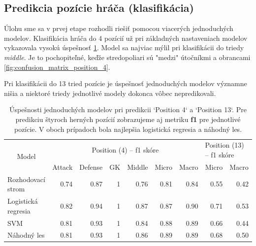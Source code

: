 \documentclass[runningheads]{llncs}
\begin{document}
\subsection{\label{classification} Predikcia pozície hráča (klasifikácia)}

Úlohu sme sa v prvej etape rozhodli riešiť pomocou viacerých jednoduchých modelov. Klasifikácia hráča do 4 pozícií už pri základných nastaveniach modelov vykazovala vysokú úspešnosť \ref{tab:f1_position_4}. Model sa najviac mýlil pri klasifikácii do triedy \textit{middle}. Je to pochopiteľné, keďže stredopoliari sú "medzi" útočníkmi a obrancami \ref{fig:confusion_matrix_position_4}. 

Pri klasifikácii do 13 tried pozície je úspešnosť jednoduchých modelov významne nišia a niektoré triedy jednotlivé modely dokonca vôbec nepredikovali.

\begin{table}[]
    \begin{tabular}{|l|rrrrrr|rr}
    \hline
    \multicolumn{1}{|c|}{\multirow{2}{*}{Model}} & \multicolumn{6}{c|}{Position (4) -- f1 skóre}                               & \multicolumn{2}{l|}{Position (13) -- f1 skóre} \\
    \multicolumn{1}{|c|}{}                       & Attack & Defense & GK         & Middle & Micro & \multicolumn{1}{l|}{Macro} & Micro       & \multicolumn{1}{l|}{Macro}       \\ \hline
    Rozhodovací strom                            & 0.74   & 0.87    & 1          & 0.76   & 0.81  & 0.84                       & 0.55        & \multicolumn{1}{r|}{0.42}        \\
    Logistická regresia                          & 0.82   & 0.94    & 1          & 0.87   & 0.87  & 0.90                       & 0.71        & \multicolumn{1}{r|}{0.53}        \\
    SVM                                          & 0.81   & 0.93    & 1          & 0.84   & 0.88  & 0.89                       & 0.66        & \multicolumn{1}{r|}{0.44}        \\
    Náhodný les                                  & 0.81   & 0.93    & 1          & 0.86   & 0.89  & 0.89                       & 0.68        & \multicolumn{1}{r|}{0.50}        \\ \hline
    \end{tabular}
    \\
    \caption{\label{tab:f1_position_4} Úspešnosti jednoduchých modelov pri predikcii `Position 4` a `Position 13`. Pre predikciu štyroch herných pozícií zobrazujeme aj metriku \textbf{f1} pre jednotlivé pozície. V oboch prípadoch bola najlepšia logistická regresia a náhodný les.}
\end{table}
\end{document}
